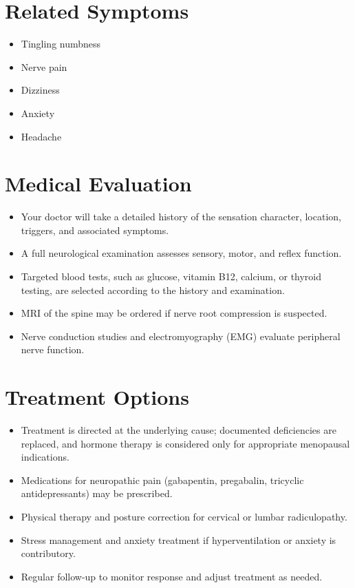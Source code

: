 \section*{Related Symptoms}
\begin{itemize}
  \item Tingling numbness
  \item Nerve pain
  \item Dizziness
  \item Anxiety
  \item Headache
\end{itemize}


\section*{Medical Evaluation}
\begin{itemize}
  \item Your doctor will take a detailed history of the sensation character, location, triggers, and associated symptoms.
  \item A full neurological examination assesses sensory, motor, and reflex function.
  \item Targeted blood tests, such as glucose, vitamin B12, calcium, or thyroid testing, are selected according to the history and examination.
  \item MRI of the spine may be ordered if nerve root compression is suspected.
  \item Nerve conduction studies and electromyography (EMG) evaluate peripheral nerve function.
\end{itemize}

\section*{Treatment Options}
\begin{itemize}
  \item Treatment is directed at the underlying cause; documented deficiencies are replaced, and hormone therapy is considered only for appropriate menopausal indications.
  \item Medications for neuropathic pain (gabapentin, pregabalin, tricyclic antidepressants) may be prescribed.
  \item Physical therapy and posture correction for cervical or lumbar radiculopathy.
  \item Stress management and anxiety treatment if hyperventilation or anxiety is contributory.
  \item Regular follow-up to monitor response and adjust treatment as needed.
\end{itemize}


